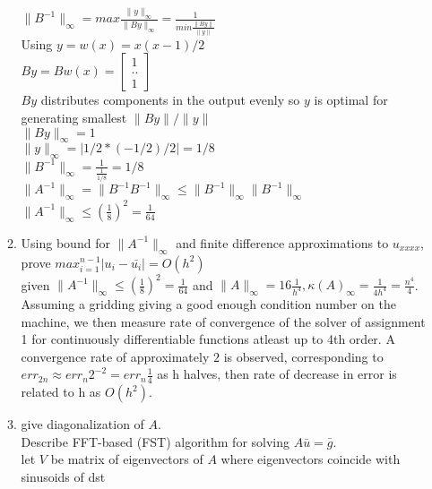 \documentclass[12pt,letter]{article}
\begin{document}
\begin{enumerate}
\begin{enumerate}
    $\|B^{-1}\|_{\infty}=max \frac{\|y\|_{\infty}}{\|By\|_{\infty}}=\frac{1}{ min \frac{\|By\|}{\|y\|}}$\\
    
    Using $y=w(x)=x(x-1)/2$\\
    $By=Bw(x)=\begin{bmatrix}1 \\ .. \\ 1 \end{bmatrix}$\\
    $By$ distributes components in the output evenly so $y$ is optimal for generating smallest $\|By\|/\|y\|$\\
    $\|By\|_{\infty}=1$\\
    $\|y\|_{\infty}=|1/2*(-1/2)/2|=1/8$\\
    $\|B^{-1}\|_{\infty}= \frac{1}{\frac{1}{1/8}}=1/8$\\

    $\|A^{-1}\|_{\infty} = \|B^{-1}B^{-1}\|_{\infty} \leq \|B^{-1}\|_{\infty} \|B^{-1}\|_{\infty}$\\
    $\|A^{-1}\|_{\infty} \leq (\frac{1}{8})^2=\frac{1}{64}$\\
    
  \item Using bound for $\|A^{-1}\|_{\infty}$ and finite difference approximations to $u_{xxxx}$, prove $max_{i=1}^{n-1} |u_i-\bar{u_i}| = O(h^2)$\\

    given $\|A^{-1}\|_{\infty} \leq (\frac{1}{8})^2=\frac{1}{64}$ and $\|A\|_{\infty}=16\frac{1}{h^4}, \kappa(A)_{\infty} = \frac{1}{4 h^4}=\frac{n^4}{4}$. Assuming a gridding giving a good enough condition number on the machine, we then measure rate of convergence of the solver of assignment 1 for continuously differentiable functions atleast up to 4th order. A convergence rate of approximately $2$ is observed, corresponding to $err_{2n} \approx err_{n} 2^{-2}=err_{n} \frac{1}{4}$ as h halves, then rate of decrease in error is related to h as $O(h^2)$.\\

    \pagebreak
    
  \item give diagonalization of $A$.\\ Describe FFT-based (FST) algorithm for solving $A\bar{u}=\bar{g}$.\\

    let $V$ be matrix of eigenvectors of $A$ where eigenvectors coincide with sinusoids of dst\\
    

\end{enumerate}
\end{enumerate}
\end{document}
